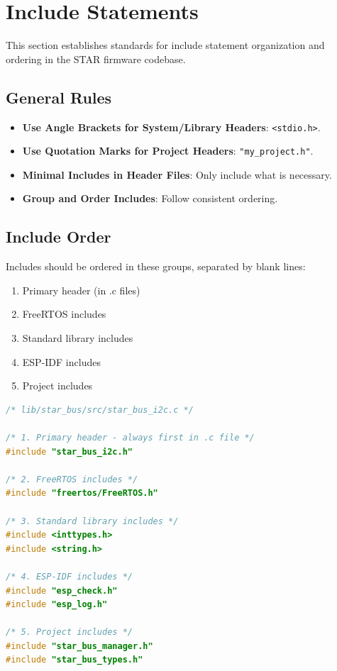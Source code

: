 \section{Include Statements}

This section establishes standards for include statement organization and ordering in the STAR firmware codebase.

\subsection{General Rules}

\begin{itemize}
    \item \textbf{Use Angle Brackets for System/Library Headers}: \texttt{<stdio.h>}.
    \item \textbf{Use Quotation Marks for Project Headers}: \texttt{"my\_project.h"}.
    \item \textbf{Minimal Includes in Header Files}: Only include what is necessary.
    \item \textbf{Group and Order Includes}: Follow consistent ordering.
\end{itemize}

\subsection{Include Order}

Includes should be ordered in these groups, separated by blank lines:

\begin{enumerate}
    \item Primary header (in .c files)
    \item FreeRTOS includes
    \item Standard library includes
    \item ESP-IDF includes
    \item Project includes
\end{enumerate}

\begin{lstlisting}[language=C]
/* lib/star_bus/src/star_bus_i2c.c */

/* 1. Primary header - always first in .c file */
#include "star_bus_i2c.h"

/* 2. FreeRTOS includes */
#include "freertos/FreeRTOS.h"

/* 3. Standard library includes */
#include <inttypes.h>
#include <string.h>

/* 4. ESP-IDF includes */
#include "esp_check.h"
#include "esp_log.h"

/* 5. Project includes */
#include "star_bus_manager.h"
#include "star_bus_types.h"
\end{lstlisting}


